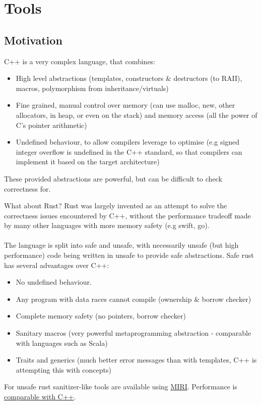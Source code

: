 \chapter{Tools}

\section{Motivation}
C++ is a very complex language, that combines:
\begin{itemize}
    \item High level abstractions (templates, constructors \& destructors (to RAII), macros, polymorphism from inheritance/virtuals)
    \item Fine grained, manual control over memory (can use malloc, new, other allocators, in heap, or even on the stack) and memory access (all the power of C's pointer arithmetic)
    \item Undefined behaviour, to allow compilers leverage to optimise (e.g signed integer overflow is undefined in the C++ standard, so that compilers can implement it based on the target architecture)  
\end{itemize}
These provided abstractions are powerful, but can be difficult to check correctness for.

\begin{sidenotebox}{What about Rust?}
    Rust was largely invented as an attempt to solve the correctness issues encountered by C++, without the performance tradeoff made by many other languages with more memory safety (e.g swift, go).
    \\
    \\ The language is split into safe and unsafe, with necessarily unsafe (but high performance) code being written in unsafe to provide safe abstractions. Safe rust has several advantages over C++:
    \begin{itemize}
        \item No undefined behaviour.
        \item Any program with data races cannot compile (ownership \& borrow checker)
        \item Complete memory safety (no pointers, borrow checker)
        \item Sanitary macros (very powerful metaprogramming abstraction - comparable with languages such as Scala)
        \item Traits and generics (much better error messages than with templates, C++ is attempting this with concepts)
    \end{itemize}
    For unsafe rust sanitizer-like tools are available using \href{https://github.com/rust-lang/miri}{MIRI}.
    Performance is \href{https://programming-language-benchmarks.vercel.app/cpp-vs-rust}{comparable with C++}.
\end{sidenotebox}


